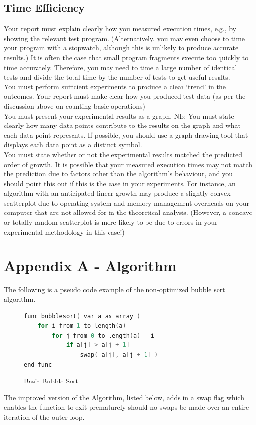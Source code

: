 \documentclass[]{article}
\begin{document}
\subsection{Time Efficiency}
Your report must explain clearly how you measured execution times, e.g., by showing the
relevant test program. (Alternatively, you may even choose to time your program with a
stopwatch, although this is unlikely to produce accurate results.) It is often the case that small
program fragments execute too quickly to time accurately. Therefore, you may need to time a
large number of identical tests and divide the total time by the number of tests to get useful
results.
\\
You must perform sufficient experiments to produce a clear ‘trend’ in the outcomes. Your
report must make clear how you produced test data (as per the discussion above on counting
basic operations).
\\
You must present your experimental results as a graph. NB: You must state clearly how many
data points contribute to the results on the graph and what each data point represents. If
possible, you should use a graph drawing tool that displays each data point as a distinct
symbol.
\\
You must state whether or not the experimental results matched the predicted order of growth.
It is possible that your measured execution times may not match the prediction due to factors
other than the algorithm’s behaviour, and you should point this out if this is the case in your
experiments. For instance, an algorithm with an anticipated linear growth may produce a
slightly convex scatterplot due to operating system and memory management overheads on
your computer that are not allowed for in the theoretical analysis. (However, a concave or
totally random scatterplot is more likely to be due to errors in your experimental methodology
in this case!)


\section{Appendix A - Algorithm}
The following is a pseudo code example of the non-optimized bubble sort algorithm. 
\begin{figure}[H]\label{BasicBubbleSort}
	\caption{Basic Bubble Sort}
\begin{lstlisting}[language=c++]
func bubblesort( var a as array )
	for i from 1 to length(a)
		for j from 0 to length(a) - i
			if a[j] > a[j + 1]
				swap( a[j], a[j + 1] )
end func
\end{lstlisting}
\end{figure}
The improved version of the Algorithm, listed below, adds in a swap flag which enables the function to exit prematurely should no swaps be made over an entire iteration of the outer loop.
\end{document}
